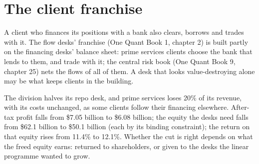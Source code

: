 \begin{omfigure}

\label{fig:fm:the-bank-markets-division:mix}
\end{omfigure}

\section{The client franchise}

A client who finances its positions with a bank also clears, borrows and trades with it. The flow desks' franchise (One Quant Book 1, chapter 2)
is built partly on the financing desks' balance sheet: prime services clients choose the bank that lends to them, and trade with it; the central
risk book (One Quant Book 9, chapter 25) nets the flows of all of them. A desk that looks value-destroying alone may be what keeps clients in the
building.

\begin{example}\label{ex:fm:the-bank-markets-division:cut}
The division halves its repo desk, and prime services loses 20\% of its revenue, with its costs unchanged, as some clients follow their financing
elsewhere. After-tax profit falls from \$7.05 billion to \$6.08 billion; the equity the desks need falls from \$62.1 billion to \$50.1 billion (each
by its binding constraint); the return on that equity rises from 11.4\% to 12.1\%. Whether the cut is right depends on what the freed equity earns:
returned to shareholders, or given to the desks the linear programme wanted to grow.
\end{example}

